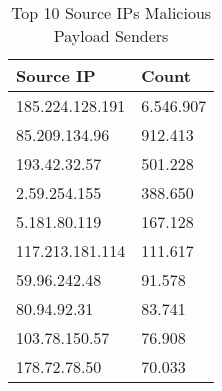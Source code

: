 \begin{table}
\caption{Top 10 Source IPs Malicious Payload Senders}
\label{tab:top10_malicious_payload_src_ips}
\begin{tabular}{ll}
\toprule
Source IP & Count \\
\midrule
185.224.128.191 & 6.546.907 \\
85.209.134.96 & 912.413 \\
193.42.32.57 & 501.228 \\
2.59.254.155 & 388.650 \\
5.181.80.119 & 167.128 \\
117.213.181.114 & 111.617 \\
59.96.242.48 & 91.578 \\
80.94.92.31 & 83.741 \\
103.78.150.57 & 76.908 \\
178.72.78.50 & 70.033 \\
\bottomrule
\end{tabular}
\end{table}
